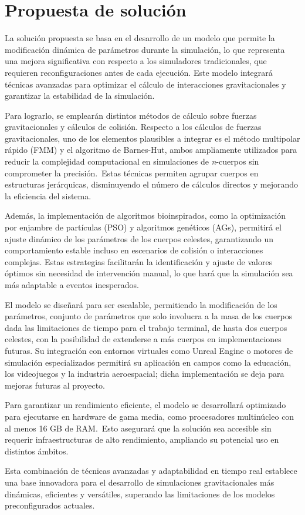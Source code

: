 \section{Propuesta de solución}

La solución propuesta se basa en el desarrollo de un modelo que permite la modificación dinámica de parámetros durante la simulación, lo que representa una mejora significativa con respecto a los simuladores tradicionales, que requieren reconfiguraciones antes de cada ejecución. Este modelo integrará técnicas avanzadas para optimizar el cálculo de interacciones gravitacionales y garantizar la estabilidad de la simulación.

Para lograrlo, se emplearán distintos métodos de cálculo sobre fuerzas gravitacionales y cálculos de colisión. Respecto a los cálculos de fuerzas gravitacionales, uno de los elementos plausibles a integrar es el método multipolar rápido (FMM) y el algoritmo de Barnes-Hut, ambos ampliamente utilizados para reducir la complejidad computacional en simulaciones de \textit{n}-cuerpos sin comprometer la precisión.\ Estas técnicas permiten agrupar cuerpos en estructuras jerárquicas, disminuyendo el número de cálculos directos y mejorando la eficiencia del sistema.

Además, la implementación de algoritmos bioinspirados, como la optimización por enjambre de partículas (PSO) y algoritmos genéticos (AGs), permitirá el ajuste dinámico de los parámetros de los cuerpos celestes, garantizando un comportamiento estable incluso en escenarios de colisión o interacciones complejas. Estas estrategias facilitarán la identificación y ajuste de valores óptimos sin necesidad de intervención manual, lo que hará que la simulación sea más adaptable a eventos inesperados.

El modelo se diseñará para ser escalable, permitiendo la modificación de los parámetros, conjunto de parámetros que solo involucra a la masa de los cuerpos dada las limitaciones de tiempo para el trabajo terminal, de hasta dos cuerpos celestes, con la posibilidad de extenderse a más cuerpos en implementaciones futuras. Su integración con entornos virtuales como Unreal Engine o motores de simulación especializados permitirá su aplicación en campos como la educación, los videojuegos y la industria aeroespacial; dicha implementación se deja para mejoras futuras al proyecto.

Para garantizar un rendimiento eficiente, el modelo se desarrollará optimizado para ejecutarse en hardware de gama media, como procesadores multinúcleo con al menos 16 GB de RAM.\ Esto asegurará que la solución sea accesible sin requerir infraestructuras de alto rendimiento, ampliando su potencial uso en distintos ámbitos.

Esta combinación de técnicas avanzadas y adaptabilidad en tiempo real establece una base innovadora para el desarrollo de simulaciones gravitacionales más dinámicas, eficientes y versátiles, superando las limitaciones de los modelos preconfigurados actuales.